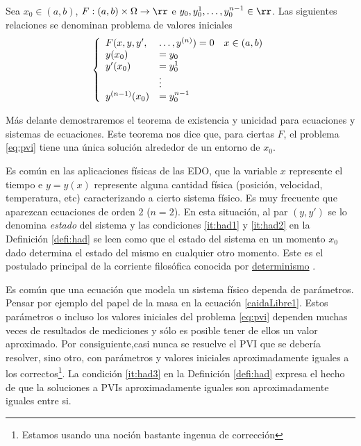 \begin{definicion}{} Sea $x_0\in(a,b)$, $F:(a,b)\times \Omega\to\rr$ e $y_0,y_0^1,\ldots,y_0^{n-1}\in\rr$. Las siguientes relaciones  se denominan problema de
valores iniciales
\begin{equation}\label{eq:pvi}
 \left\{\begin{array}{l l l}
         F(x,y,y',&\ldots,y^{(n)})=0& x\in(a,b)\\
         y(x_0)&=y_0&\\
         y'(x_0)&=y_0^1&\\
          & \vdots &\\
          y^{(n-1)}(x_0)&=y_0^{n-1}&\\
        \end{array}
   \right.
\end{equation}

\end{definicion}

Más delante demostraremos el teorema de existencia y unicidad para ecuaciones y sistemas de ecuaciones. Este teorema nos dice que, para ciertas $F$, el problema \eqref{eq:pvi} tiene una única solución alrededor de un entorno de $x_0$.

Es común en las aplicaciones físicas de las EDO, que la variable $x$ represente el tiempo e $y=y(x)$ represente alguna cantidad física (posición, velocidad, temperatura, etc) caracterizando a cierto sistema físico. Es muy frecuente que aparezcan ecuaciones de orden $2$  ($n=2$). En esta situación, al par $(y,y')$ se lo denomina \emph{estado} del sistema y las condiciones \ref{it:had1} y \ref{it:had2} en la Definición \ref{defi:had} se leen como que el estado del sistema en un momento $x_0$ dado determina el estado del mismo en cualquier otro momento. Este es el postulado principal de la corriente  filosófica conocida por   \href{https://es.wikipedia.org/wiki/Determinismo}{determinismo} .

 Es común que una ecuación que modela un sistema físico dependa de parámetros. Pensar por ejemplo del papel de la masa en la ecuación \eqref{caidaLibre1}. Estos parámetros o incluso los valores iniciales del problema \eqref{eq:pvi} dependen muchas veces de resultados de mediciones y sólo es posible tener de ellos un valor aproximado. Por consiguiente,casi nunca se resuelve el PVI que se debería resolver, sino otro, con parámetros y valores iniciales aproximadamente iguales a los correctos\footnote{Estamos usando una noción bastante ingenua de corrección}.
 La condición \ref{it:had3} en la Definición \ref{defi:had} expresa el hecho de que la soluciones a PVIs aproximadamente iguales son aproximadamente iguales entre si.


